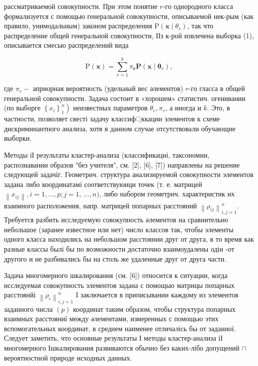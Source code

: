 \documentclass[10pt]{article}
\begin{document}
рассматриваемой совокупности. При этом понятие $r$-го однородного класса формализуется с помощью генеральной совокупности, описываемой нек-рым (как правило, унимодальным) законом распределения $\mathrm{P}\left(\boldsymbol{x} \mid \theta_{r}\right)$, так что распределение общей генеральной совокупности, ІІз к-рой извлечена выборка (1), описывается смесью распределений вида



\[

\mathrm{P}(\boldsymbol{x})=\sum_{r=1}^{k} \pi_{\boldsymbol{r}} \mathbf{P}\left(\boldsymbol{x} \mid \boldsymbol{\theta}_{r}\right),

\]



где $\pi_{r}-$ априорная вероятность (удельный вес әлементов) $r$-го гласса в общей генеральной совокупности. Задача состоит в «хорошем» статистич. огенивании (по выборге $\left.\left\{x_{i}\right\}_{1}^{n}\right)$ неизвестных параметров $\theta_{r}, \pi_{r}$, а иногда и $k$. Это, в частности, позволяет свесті задачу классиф্ккации элементов к схеме дискриминантного анализа, хотя в данном случае отсутствовали обучающие выборки.



Методы іІ результаты кластер-анализа (классификациі, таксономии, распознавании образов "без учителя", см. [2], [6], [7]) направлены на решение следующей задачіг. Геометрич. структура анализируемой совокупности элементов задана либо координатамі соответствуюици точек (т. е. матрицей $\left\|x_{i j}\right\|, i=1, \ldots, p ; j=1$, $\ldots, n)$, либо набором геометрич. характеристик их взаимного расположения, напр. матрицей попарных расстояний $\left\|\rho_{i j}\right\|_{i, j=1}^{n}$. Требуется разбить исследуемую совокупность әлементов на сравнительно небольшое (заранее известное или нет) число классов так, чтобы элементы одного класса находились на небольшом расстоянии друг от друга, в то время как разные классы былі бы по возможности достаточно взаимоудалены одін -от другого и не разбивались бы на столь же удаленные друг от друга части.



Задача многомерного шкалирования (см. [6]) относится к ситуации, когда исследуемая совокупность элементов задана с помощью матрицы попарных расстоянйі $\left\|\rho_{i}\right\|_{i, j=1}^{n}$ І заключается в приписывании каждому из элементов заданного числа $(p)$ координат таким образом, чтобы структура попарных взаимных расстояниї между әлементами, измеренных с помощью этих вспомогательных координат, в среднем наименее отличалісь бы от заданної. Следует заметить, что основные результаты І методы кластер-анализа іІ многомерного Ішкалирования развиваются обычно без каких-лібо допущений $\cap$ вероятностной природе исходных данных.
\end{document}
